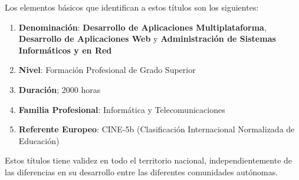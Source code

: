 Los elementos básicos que identifican a estos títulos son los siguientes: 

\begin{enumerate}
	\item {\bfseries Denominación}: {\bfseries Desarrollo de Aplicaciones Multiplataforma}, {\bfseries Desarrollo de Aplicaciones Web} y {\bfseries Administración de Sistemas Informáticos y en Red}
	\item {\bfseries Nivel}: Formación Profesional de Grado Superior
	\item {\bfseries Duración}; 2000 horas
	\item {\bfseries Familia Profesional}: Informática y Telecomunicaciones
	\item {\bfseries Referente Europeo}: CINE-5b (Clasificación Internacional Normalizada de Educación)
\end{enumerate}

Estos títulos tiene validez en todo el territorio nacional, independientemente de las diferencias en su desarrollo entre las diferentes comunidades autónomas.


 

 
 
 
  
 

